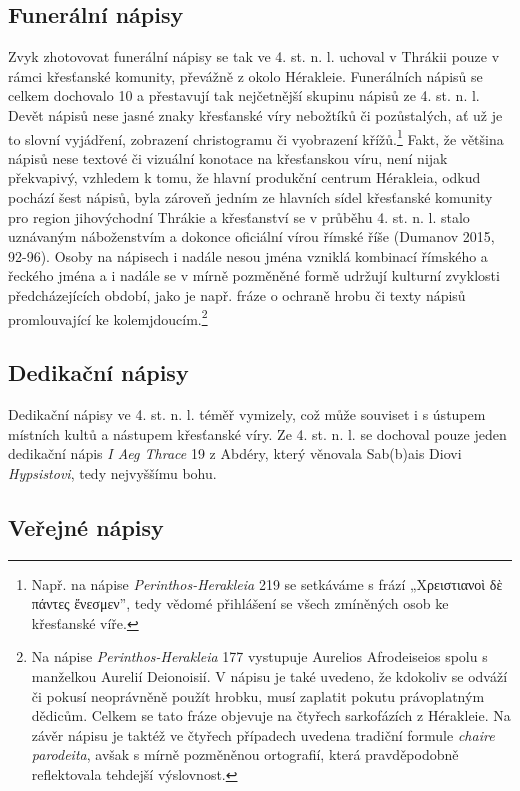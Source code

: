 \subsection[funerální-nápisy-17]{Funerální nápisy}

Zvyk zhotovovat funerální nápisy se tak ve 4. st. n. l. uchoval v Thrákii pouze v rámci křesťanské komunity, převážně z okolo Hérakleie. Funerálních nápisů se celkem dochovalo 10 a přestavují tak nejčetnější skupinu nápisů ze 4. st. n. l. Devět nápisů nese jasné znaky křesťanské víry nebožtíků či pozůstalých, ať už je to slovní vyjádření, zobrazení christogramu či vyobrazení křížů.\footnote{Např. na nápise {\em Perinthos-Herakleia} 219 se setkáváme s frází „Χρειστιανοὶ δὲ πάντες ἔνεσμεν”, tedy vědomé přihlášení se všech zmíněných osob ke křesťanské víře.} Fakt, že většina nápisů nese textové či vizuální konotace na křesťanskou víru, není nijak překvapivý, vzhledem k tomu, že hlavní produkční centrum Hérakleia, odkud pochází šest nápisů, byla zároveň jedním ze hlavních sídel křesťanské komunity pro region jihovýchodní Thrákie a křesťanství se v průběhu 4. st. n. l. stalo uznávaným náboženstvím a dokonce oficiální vírou římské říše (Dumanov 2015, 92-96). Osoby na nápisech i nadále nesou jména vzniklá kombinací římského a řeckého jména a i nadále se v mírně pozměněné formě udržují kulturní zvyklosti předcházejících období, jako je např. fráze o ochraně hrobu či texty nápisů promlouvající ke kolemjdoucím.\footnote{Na nápise {\em Perinthos-Herakleia} 177 vystupuje Aurelios Afrodeiseios spolu s manželkou Aurelií Deionoisií. V nápisu je také uvedeno, že kdokoliv se odváží či pokusí neoprávněně použít hrobku, musí zaplatit pokutu právoplatným dědicům. Celkem se tato fráze objevuje na čtyřech sarkofázích z Hérakleie. Na závěr nápisu je taktéž ve čtyřech případech uvedena tradiční formule {\em chaire parodeita}, avšak s mírně pozměněnou ortografií, která pravděpodobně reflektovala tehdejší výslovnost.}

\subsection[dedikační-nápisy-17]{Dedikační nápisy}

Dedikační nápisy ve 4. st. n. l. téměř vymizely, což může souviset i s ústupem místních kultů a nástupem křesťanské víry. Ze 4. st. n. l. se dochoval pouze jeden dedikační nápis {\em I Aeg Thrace} 19 z Abdéry, který věnovala Sab(b)ais Diovi {\em Hypsistovi}, tedy nejvyššímu bohu.

\subsection[veřejné-nápisy-17]{Veřejné nápisy}

